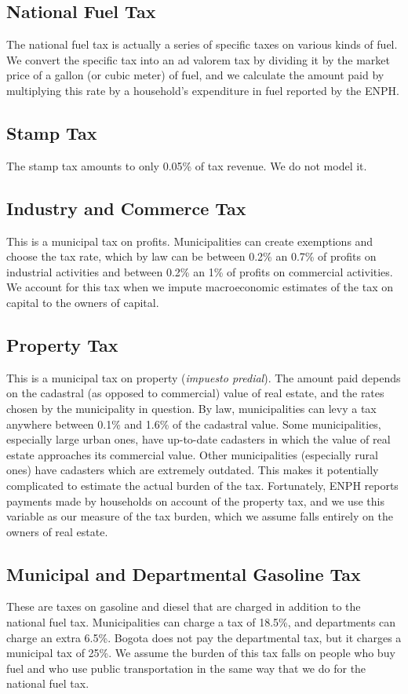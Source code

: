 \documentclass[12pt]{article}
\begin{document}
\begin{appendices}
\subsection{National Fuel Tax}
The national fuel tax is actually a series of specific taxes on various kinds of fuel.
We convert the specific tax into an ad valorem tax by dividing it by the market price of a gallon (or cubic meter) of fuel, and we calculate the amount paid by multiplying this rate by a household's expenditure in fuel reported by the ENPH.

\subsection{Stamp Tax}
The stamp tax amounts to only 0.05\% of tax revenue.
We do not model it.

\subsection{Industry and Commerce Tax}
This is a municipal tax on profits.
Municipalities can create exemptions and choose the tax rate, which by law can be between 0.2\% an 0.7\% of profits on industrial activities and between 0.2\% an 1\% of profits on commercial activities.
We account for this tax when we impute macroeconomic estimates of the tax on capital to the owners of capital.

\subsection{Property Tax}
This is a municipal tax on property (\textit{impuesto predial}).
The amount paid depends on the cadastral (as opposed to commercial) value of real estate, and the rates chosen by the municipality in question.
By law, municipalities can levy a tax anywhere between 0.1\% and 1.6\% of the cadastral value.
Some municipalities, especially large urban ones, have up-to-date cadasters in which the value of real estate approaches its commercial value.
Other municipalities (especially rural ones) have cadasters which are extremely outdated.
This makes it potentially complicated to estimate the actual burden of the tax.
Fortunately, ENPH reports payments made by households on account of the property tax, and we use this variable as our measure of the tax burden, which we assume falls entirely on the owners of real estate.

\subsection{Municipal and Departmental Gasoline Tax}
These are taxes on gasoline and diesel that are charged in addition to the national fuel tax.
Municipalities can charge a tax of 18.5\%, and departments can charge an extra 6.5\%.
Bogota does not pay the departmental tax, but it charges a municipal tax of 25\%.
We assume the burden of this tax falls on people who buy fuel and who use public transportation in the same way that we do for the national fuel tax.


\end{appendices}
\end{document}
